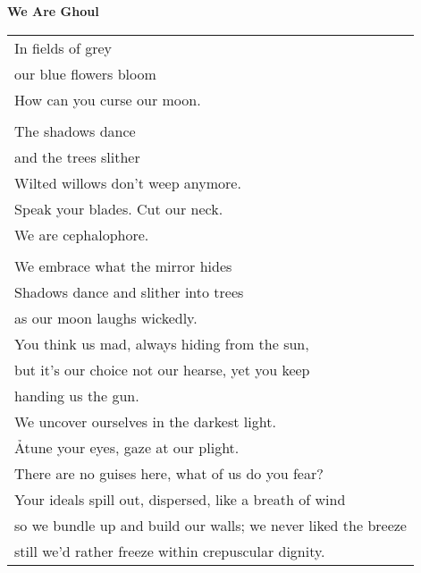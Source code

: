 \documentclass{article}
\begin{document}
\newcommand{\hh}{\hspace*{1ex}}
\begin{center}
\textbf{We Are Ghoul} \\
\vspace*{2ex}
\begin{tabular}{l}
In fields of grey \\
our blue flowers bloom \\
How can you curse our moon. \\
\\
The shadows dance \\
and the trees slither \\

Wilted willows don't weep anymore. \\
Speak your blades. Cut our neck. \\
We are cephalophore. \\
\\
We embrace what the mirror hides \\


Shadows dance and slither into trees \\
\hh as our moon laughs wickedly. \\
You think us mad, always hiding from the sun, \\
\hh but it's our choice not our hearse, yet you keep \\
\hh handing us the gun. \\
We uncover ourselves in the darkest light. \\
\h Atune your eyes, gaze at our plight. \\ %
There are no guises here, what of us do you fear? \\ %
Your ideals spill out, dispersed, like a breath of wind \\
\hh so we bundle up and build our walls; we never liked the breeze \\
\hh still we'd rather freeze within crepuscular dignity. \\ %
\end{tabular}
\end{center}
\end{document}

